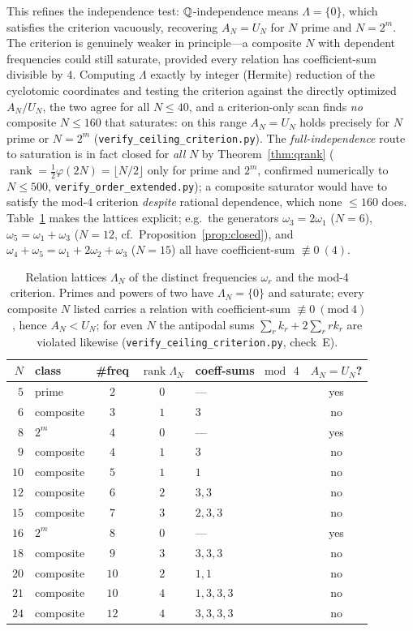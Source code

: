 This refines the independence test: $\mathbb{Q}$-independence means $\Lambda=\{0\}$, which satisfies the
criterion vacuously, recovering $A_N=U_N$ for $N$ prime and $N=2^m$. The criterion is genuinely weaker in
principle---a composite $N$ with dependent frequencies could still saturate, provided every relation has
coefficient-sum divisible by $4$. Computing $\Lambda$ exactly by integer (Hermite) reduction of the
cyclotomic coordinates and testing the criterion against the directly optimized $A_N/U_N$, the two
agree for all $N\le40$, and a criterion-only scan finds \emph{no} composite $N\le160$ that saturates:
on this range $A_N=U_N$ holds precisely for $N$ prime or $N=2^m$ (\texttt{verify\_ceiling\_criterion.py}).
The \emph{full-independence} route to saturation is in fact closed for \emph{all} $N$ by
Theorem~\ref{thm:qrank} ($\operatorname{rank}=\tfrac12\varphi(2N)=\lfloor N/2\rfloor$ only for prime and
$2^m$, confirmed numerically to $N\le500$, \texttt{verify\_order\_extended.py}); a composite saturator
would have to satisfy the mod-$4$ criterion \emph{despite} rational dependence, which none $\le160$ does.
Table~\ref{tab:lattices} makes the lattices explicit; e.g.\ the generators
$\omega_3=2\omega_1$ ($N=6$), $\omega_5=\omega_1+\omega_3$ ($N=12$, cf.\ Proposition~\ref{prop:closed}),
and $\omega_4+\omega_5=\omega_1+2\omega_2+\omega_3$ ($N=15$) all have coefficient-sum $\not\equiv0\ (4)$.

\begin{table}[ht]\centering
\caption{Relation lattices $\Lambda_N$ of the distinct frequencies $\omega_r$ and the mod-4 criterion.
Primes and powers of two have $\Lambda_N=\{0\}$ and saturate; every composite $N$ listed carries a
relation with coefficient-sum $\not\equiv0\ (\mathrm{mod}\ 4)$, hence $A_N<U_N$; for even $N$ the
antipodal sums $\sum_r k_r+2\sum_r rk_r$ are violated likewise (\texttt{verify\_ceiling\_criterion.py},
check~E).}\label{tab:lattices}
\begin{tabular}{rlccl c}
\toprule
$N$ & class & \#freq & $\operatorname{rank}\Lambda_N$ & coeff-sums $\bmod\,4$ & $A_N=U_N$?\\
\midrule
$5$ & prime & $2$ & $0$ & --- & yes\\
$6$ & composite & $3$ & $1$ & $3$ & no\\
$8$ & $2^m$ & $4$ & $0$ & --- & yes\\
$9$ & composite & $4$ & $1$ & $3$ & no\\
$10$ & composite & $5$ & $1$ & $1$ & no\\
$12$ & composite & $6$ & $2$ & $3,3$ & no\\
$15$ & composite & $7$ & $3$ & $2,3,3$ & no\\
$16$ & $2^m$ & $8$ & $0$ & --- & yes\\
$18$ & composite & $9$ & $3$ & $3,3,3$ & no\\
$20$ & composite & $10$ & $2$ & $1,1$ & no\\
$21$ & composite & $10$ & $4$ & $1,3,3,3$ & no\\
$24$ & composite & $12$ & $4$ & $3,3,3,3$ & no\\
\bottomrule
\end{tabular}
\end{table}

